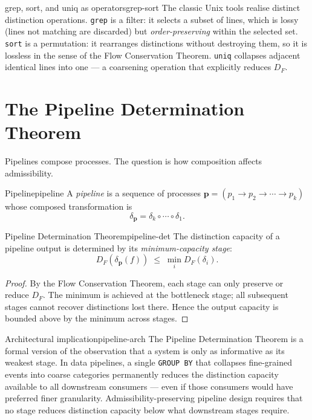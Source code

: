 \documentclass[12pt,twoside,openright]{book}
\newcommand{\csicon} {\marginpar{\tiny\color{DistBlue}\faCode}}
\begin{document}
\begin{remark}{grep, sort, and uniq as operators}{grep-sort}
  \csicon
  The classic Unix tools realise distinct distinction
  operations. \texttt{grep} is a filter: it selects a
  subset of lines, which is lossy (lines not matching are
  discarded) but \emph{order-preserving} within the
  selected set. \texttt{sort} is a permutation: it
  rearranges distinctions without destroying them, so it
  is lossless in the sense of the Flow Conservation
  Theorem. \texttt{uniq} collapses adjacent identical
  lines into one — a coarsening operation that explicitly
  reduces $D_F$.
\end{remark}

\section{The Pipeline Determination Theorem}

Pipelines compose processes. The question is how
composition affects admissibility.

\begin{definition}{Pipeline}{pipeline}
  A \emph{pipeline} is a sequence of processes
  $\mathbf{p} = (p_1 \to p_2 \to \cdots \to p_k)$
  whose composed transformation is
  \[
    \delta_\mathbf{p} = \delta_k \circ \cdots \circ \delta_1.
  \]
\end{definition}

\begin{theorem}{Pipeline Determination Theorem}{pipeline-det}
  The distinction capacity of a pipeline output is
  determined by its \emph{minimum-capacity stage}:
  \[
    D_F(\delta_\mathbf{p}(f))
    \;\le\;
    \min_{i} D_F(\delta_i).
  \]
\end{theorem}

\begin{proof}
  By the Flow Conservation Theorem, each stage can only
  preserve or reduce $D_F$. The minimum is achieved at
  the bottleneck stage; all subsequent stages cannot
  recover distinctions lost there. Hence the output
  capacity is bounded above by the minimum across stages.
\end{proof}

\begin{remark}{Architectural implication}{pipeline-arch}
  \csicon
  The Pipeline Determination Theorem is a formal version
  of the observation that a system is only as informative
  as its weakest stage. In data pipelines, a single
  \texttt{GROUP BY} that collapses fine-grained events
  into coarse categories permanently reduces the
  distinction capacity available to all downstream
  consumers — even if those consumers would have
  preferred finer granularity. Admissibility-preserving
  pipeline design requires that no stage reduces
  distinction capacity below what downstream stages
  require.
\end{remark}
\end{document}
